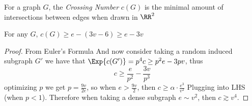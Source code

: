 \documentclass[a4paper, 11pt, oneside]{book}
\begin{document}
\begin{defn}
	 For a graph $G$, the \emph{Crossing Number} $c(G)$ is the minimal amount of intersections between edges when drawn in $\RR^2$
\end{defn}
\begin{claim}
	For any $G$, $c(G) \ge e-(3v-6) \ge e-3v$
\end{claim}
\begin{proof}
	From Euler's Formula
And now consider taking a random induced subgraph $G'$ we have that $\Exp{c(G')} = p^4c\ge p^2e - 3pv$, thus
	\[
	c\ge \frac{e}{p^2}-\frac{3v}{p^3}
	\]
optimizing $p$ we get $p = \frac{9v}{2e}$, so when $e > \frac{9v}{2}$, then $c \ge \alpha\cdot \frac{e^3}{v^2}$ Plugging into LHS (when $p<1$). Therefore when taking a dense subgraph $e\sim v^2$, then $c\gtrsim v^4$.
\end{proof}
\end{document}
